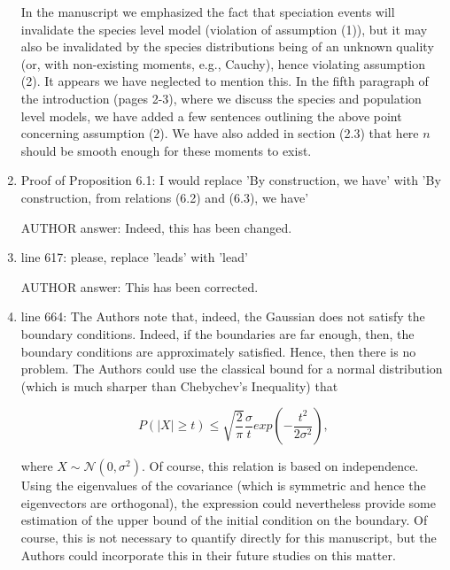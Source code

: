 \documentclass[a4paper,11pt]{scrartcl}
\begin{document}
\begin{enumerate}
In the manuscript we emphasized the fact that speciation events will invalidate the species level model (violation of assumption (1)), but it may also be invalidated by the species distributions being of an unknown quality (or, with non-existing moments, e.g., Cauchy), hence violating assumption (2). It appears we have neglected to mention this. In the fifth paragraph of the introduction (pages 2-3), where we discuss the species and population level models, we have added a few sentences outlining the above point concerning assumption (2). We have also added in section (2.3) that here $n$ should be smooth enough for these moments to exist.\\



     

\item
Proof of Proposition 6.1: I would replace 'By construction, we have' with 'By construction, from relations (6.2) and (6.3), we have'

AUTHOR answer: Indeed, this has been changed.

\item
line 617: please, replace 'leads' with 'lead'

AUTHOR answer: This has been corrected.

\item
line 664: The Authors note that, indeed, the Gaussian does not satisfy the boundary conditions. Indeed, if the boundaries are far enough, then, the boundary conditions are approximately satisfied. Hence, then there is no problem. The Authors could use the classical bound for a normal distribution (which is much sharper than Chebychev's Inequality) that

$$P(|X| \ge t ) \le \sqrt{\frac{2}{\pi}} \frac{\sigma}{t} exp(-\frac{t^2}{2 \sigma^2}),$$

where $X \sim \mathcal{N}(0,\sigma^2)$. Of course, this relation is based on independence. Using the eigenvalues of the covariance (which is symmetric and hence the eigenvectors are orthogonal), the expression could nevertheless provide some estimation of the upper bound of the initial condition on the boundary.
Of course, this is not necessary to quantify directly for this manuscript, but the Authors could incorporate this in their future studies on this matter.


\end{enumerate}
\end{document}
